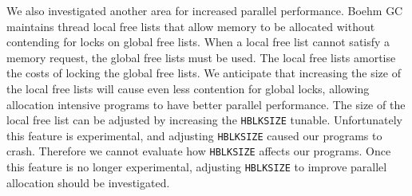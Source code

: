 We also investigated another area for increased parallel performance.
Boehm GC maintains thread local free lists that allow memory to be allocated
without contending for locks on global free lists.
When a local free list cannot satisfy a memory request, the global free
lists must be used.
The local free lists amortise the costs of locking the global free lists.
We anticipate that increasing the size of the local free lists will cause even
less contention for global locks,
allowing allocation intensive programs to have better parallel
performance.
The size of the local free list can be adjusted by increasing the
\texttt{HBLKSIZE} tunable.
Unfortunately this feature is experimental,
and adjusting \texttt{HBLKSIZE} caused our programs to crash.
Therefore we cannot evaluate how \texttt{HBLKSIZE} affects our
programs.
Once this feature is no longer experimental,
adjusting \texttt{HBLKSIZE} to improve parallel allocation should be
investigated.

